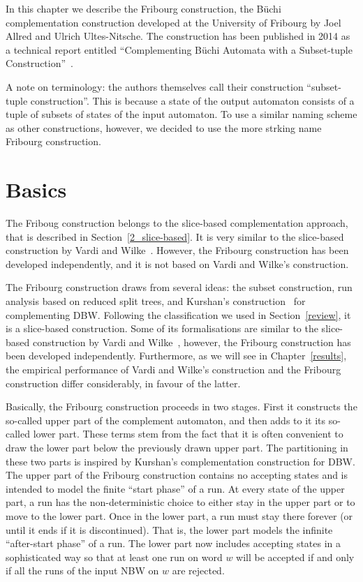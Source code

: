 In this chapter we describe the Fribourg construction, the Büchi complementation construction developed at the University of Fribourg by Joel Allred and Ulrich Ultes-Nitsche. The construction has been published in 2014 as a technical report entitled ``Complementing Büchi Automata with a Subset-tuple Construction''~\cite{2014_joel_ulrich}.

A note on terminology: the authors themselves call their construction ``subset-tuple construction''. This is because a state of the output automaton consists of a tuple of subsets of states of the input automaton. To use a similar naming scheme as other constructions, however, we decided to use the more strking name Fribourg construction.

\section{Basics}

The Friboug construction belongs to the slice-based complementation approach, that is described in Section~\ref{2_slice-based}. It is very similar to the slice-based construction by Vardi and Wilke~\cite{vardi2007automata}. However, the Fribourg construction has been developed independently, and it is not based on Vardi and Wilke's construction. 





The Fribourg construction draws from several ideas: the subset construction, run analysis based on reduced split trees, and Kurshan's construction~\cite{Kurshan198759} for complementing DBW. Following the classification we used in Section~\ref{review}, it is a slice-based construction. Some of its formalisations are similar to the slice-based construction by Vardi and Wilke~\cite{vardi2007automata}, however, the Fribourg construction has been developed independently. Furthermore, as we will see in Chapter~\ref{results}, the empirical performance of Vardi and Wilke's construction and the Fribourg construction differ considerably, in favour of the latter.

Basically, the Fribourg construction proceeds in two stages. First it constructs the so-called upper part of the complement automaton, and then adds to it its so-called lower part. These terms stem from the fact that it is often convenient to draw the lower part below the previously drawn upper part. The partitioning in these two parts is inspired by Kurshan's complementation construction for DBW. The upper part of the Fribourg construction contains no accepting states and is intended to model the finite ``start phase'' of a run. At every state of the upper part, a run has the non-deterministic choice to either stay in the upper part or to move to the lower part. Once in the lower part, a run must stay there forever (or until it ends if it is discontinued). That is, the lower part models the infinite ``after-start phase'' of a run. The lower part now includes accepting states in a sophisticated way so that at least one run on word $w$ will be accepted if and only if all the runs of the input NBW on $w$ are rejected.

